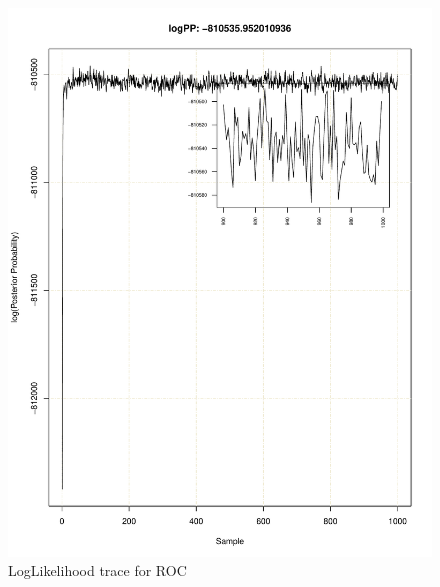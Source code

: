 \documentclass[11pt]{labbook}
\begin{document}
    \begin{figure}
        \centering
        \includegraphics[scale=.65]{FONSE_Plots/2016/June_27/ROC/Run1_LogLikeTrace}
        \caption{LogLikelihood trace for ROC}
        \label{fig:JUN27_RLOG}
    \end{figure}
\end{document}
